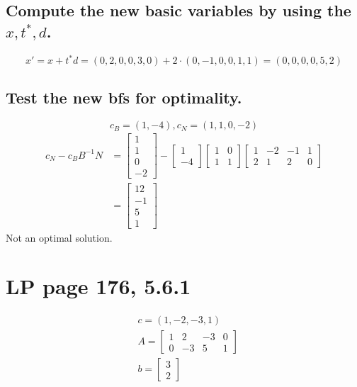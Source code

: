 \documentclass[11pt]{article}
\begin{document}
\subsection{Compute the new basic variables by using the $x, t^*, d$.}
$$x' = x + t^*d = (0, 2, 0, 0, 3, 0) + 2 \cdot (0, -1, 0, 0, 1, 1) = (0, 0, 0, 0, 5, 2)$$

\subsection{Test the new bfs for optimality.}
$$c_B = (1, -4), c_N = (1, 1, 0, -2)$$
\begin{align*}
    c_N - c_B B^{-1} N &= \begin{bmatrix} 1 \\ 1 \\ 0 \\ -2\end{bmatrix} - \begin{bmatrix} 1 \\ -4\end{bmatrix} \begin{bmatrix} 1 & 0 \\ 1 & 1\end{bmatrix} \begin{bmatrix} 1 & -2 & -1 & 1 \\ 2 & 1 & 2 & 0\end{bmatrix} \\
    &=\begin{bmatrix} 12 \\ -1 \\ 5 \\ 1\end{bmatrix}
\end{align*}
Not an optimal solution.

\pagebreak

\section{LP page 176, 5.6.1}
\begin{align*}
& c = (1, -2, -3, 1) \\
& A = \begin{bmatrix} 1 & 2 & -3 & 0 \\ 0 & -3 & 5 & 1\end{bmatrix} \\
& b =  \begin{bmatrix} 3 \\ 2\end{bmatrix}
\end{align*}
\end{document}
